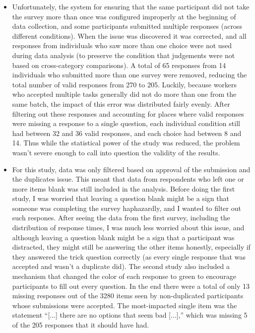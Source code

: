 \begin{itemize}
  \item%
    Unfortunately, the system for ensuring that the same participant did not take the survey more than once was configured improperly at the beginning of data collection, and some participants submitted multiple responses (across different conditions).
    When the issue was discovered it was corrected, and all responses from individuals who saw more than one choice were not used during data analysis (to preserve the condition that judgements were not based on cross-category comparisons).
    A total of 65 responses from 14 individuals who submitted more than one survey were removed, reducing the total number of valid responses from 270 to 205.
    Luckily, because workers who accepted multiple tasks generally did not do more than one from the same batch, the impact of this error was distributed fairly evenly.
    After filtering out these responses and accounting for places where valid responses were missing a response to a single question, each individual condition still had between 32 and 36 valid responses, and each choice had between 8 and 14.
    Thus while the statistical power of the study was reduced, the problem wasn't severe enough to call into question the validity of the results.

  \item%
    For this study, data was only filtered based on approval of the submission and the duplicates issue.
    This meant that data from respondents who left one or more items blank was still included in the analysis.
    Before doing the first study, I was worried that leaving a question blank might be a sign that someone was completing the survey haphazardly, and I wanted to filter out such respones.
    After seeing the data from the first survey, including the distribution of response times, I was much less worried about this issue, and although leaving a question blank might be a sign that a participant was distracted, they might still be answering the other items honestly, especially if they answered the trick question correctly (as every single response that was accepted and wasn't a duplicate did).
    The second study also included a mechanism that changed the color of each response to green to encourage participants to fill out every question.
    In the end there were a total of only 13 missing responses out of the 3280 items seen by non-duplicated participants whose submissions were accepted.
    The most-impacted single item was the statement ``[...] there are no options that seem bad [...],'' which was missing 5 of the 205 responses that it should have had.


\end{itemize}
